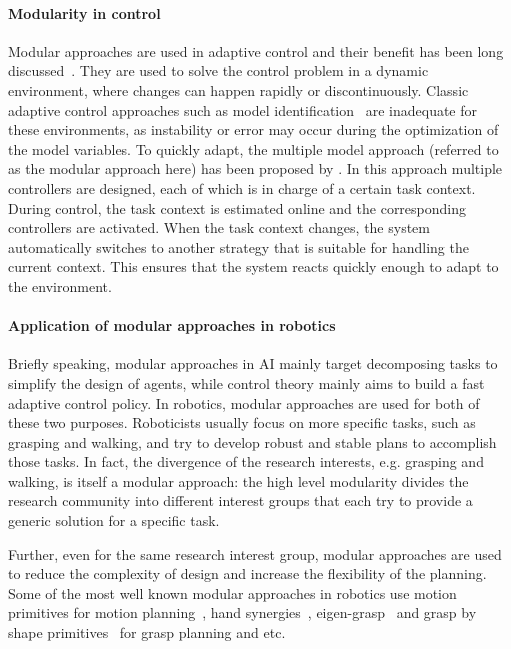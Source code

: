 \paragraph{Modularity in control}
Modular approaches are used in adaptive control and their benefit has been long discussed~\citep{jacobs1991adaptive,narendra1997adaptive}. They are used to solve the control problem in a dynamic environment, where changes can happen rapidly or discontinuously.
Classic adaptive control approaches such as model identification~\citep{khalil2004modeling} are inadequate for these environments, as instability or error may occur during the optimization of the model variables. To quickly adapt, the multiple model approach (referred to as the modular approach here) has been proposed by \citet{narendra1995adaptation}.
In this approach multiple controllers are designed, each of which is in charge of a certain task context. During control, the task context is estimated online and the corresponding controllers are activated. When the task context changes, the system automatically switches to another strategy that is suitable for handling the current context. This ensures that the system reacts quickly enough to adapt to the environment.

\paragraph{Application of modular approaches in robotics}
Briefly speaking, modular approaches in AI mainly target decomposing tasks to simplify the design of agents, while control theory mainly aims to build a fast adaptive control policy. In robotics, modular approaches are used for both of these two purposes. Roboticists usually focus on more specific tasks, such as grasping and walking, and try to develop robust and stable plans to accomplish those tasks. In fact, the divergence of the research interests, e.g. grasping and walking, is itself a modular approach: the high level modularity divides the research community into different interest groups that each try to provide a generic solution for a specific task.

Further, even for the same research interest group, modular approaches are used to reduce the complexity of design and increase the flexibility of the planning. Some of the most well known modular approaches in robotics use motion primitives for motion planning~\citep{ijspeert2002movement,inamura2004embodied,kulic2008incremental,peters2008reinforcement}, hand synergies~\citep{santello2000force,gabiccini2011role,gioioso2013mapping}, eigen-grasp~\citep{Ciocarlie2009} and grasp by shape primitives~\citep{miller2003automatic,huebner2008minimum} for grasp planning and etc.



